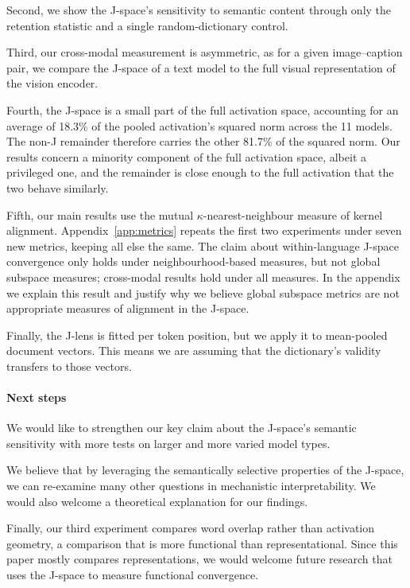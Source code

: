 \documentclass{article}
\begin{document}
Second, we show the J-space's sensitivity to semantic content through only the retention statistic and a single random-dictionary control.

Third, our cross-modal measurement is asymmetric, as for a given image--caption pair, we compare the J-space of a text model to the full visual representation of the vision encoder.

Fourth, the J-space is a small part of the full activation space, accounting
for an average of 18.3\% of the pooled activation's squared norm across the 11
models. The non-J remainder therefore carries the other 81.7\% of the squared
norm. Our results concern a
minority component of the full activation space, albeit a privileged one, and the
remainder is close enough to the full activation that the two behave similarly.

Fifth, our main results use the mutual $\kappa$-nearest-neighbour measure of kernel alignment. Appendix~\ref{app:metrics} repeats the first two experiments under seven new metrics, keeping all else the same. The claim about within-language J-space convergence only holds under neighbourhood-based measures, but not global subspace measures; cross-modal results hold under all measures. In the appendix we explain this result and justify why we believe global subspace metrics are not appropriate measures of alignment in the J-space.

Finally, the J-lens is fitted per token position, but we apply it to mean-pooled document vectors. This means we are assuming that the dictionary's validity transfers to those vectors.
\paragraph{Next steps}
We would like to strengthen our key claim about the J-space's semantic sensitivity with more tests on larger and more varied model types.

We believe that by leveraging the semantically selective properties of the
J-space, we can re-examine many other questions in mechanistic interpretability.
We would also welcome a theoretical explanation for our findings.

Finally, our third experiment compares word overlap rather than activation geometry, a comparison that is more functional than representational. Since this paper mostly compares representations, we would welcome future research that uses the J-space to measure functional convergence.

\newpage
\small


\normalsize
\end{document}
